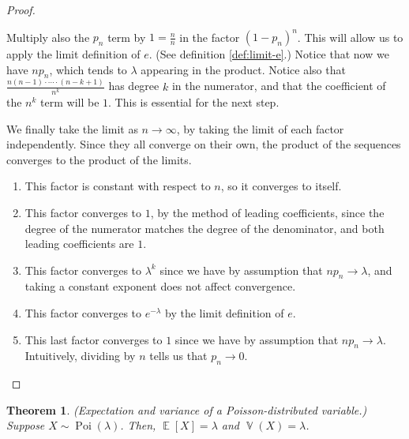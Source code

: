 \documentclass[11pt]{article}
\newtheorem{thm}{Theorem}
\theoremstyle{definition}
\theoremstyle{remark}
\newcommand{\parens}[1]{\left(#1\right)}
\DeclareMathOperator{\Expect}{\mathbb{E}}
\newcommand{\E}[1]{\Expect{\left[#1\right]}}
\DeclareMathOperator{\Var}{\mathbb{V}}
\newcommand{\V}[1]{\Var{\parens{#1}}}
\DeclareMathOperator{\PoiOp}{Poi}
\newcommand{\Poi}[1]{ \PoiOp\parens{#1} }
\begin{document}
\begin{proof}
\begin{description}
            Multiply also the $p_n$ term by $1 = \frac{n}{n}$ in the factor
            $(1 - p_n)^n$.
            This will allow us to apply the limit definition of $e$.
            (See definition \ref{def:limit-e}.)
            Notice that now we have $n p_n$, which tends to $\lambda$ appearing
            in the product.
            Notice also that $\frac{n(n-1) \cdot\cdots\cdot (n-k+1)}{n^k}$ has
            degree $k$ in the numerator, and that the coefficient of the $n^k$
            term will be $1$.
            This is essential for the next step.
        \item[\stepAB{4}{5}]
            We finally take the limit as $n \to \infty$, by taking the limit of
            each factor independently.
            Since they all converge on their own, the product of the sequences
            converges to the product of the limits.

            \begin{enumerate}
                \item
                    This factor is constant with respect to $n$, so it
                    converges to itself.
                \item
                    This factor converges to $1$, by the method of leading
                    coefficients, since the degree of the numerator matches the
                    degree of the denominator, and both leading coefficients
                    are $1$.
                \item
                    This factor converges to $\lambda^k$ since we have by
                    assumption that $n p_n \to \lambda$, and taking a constant
                    exponent does not affect convergence.
                \item
                    This factor converges to $e^{-\lambda}$ by the limit
                    definition of $e$.
                \item
                    This last factor converges to $1$ since we have by
                    assumption that $n p_n \to \lambda$. Intuitively, dividing
                    by $n$ tells us that $p_n \to 0$.
            \end{enumerate}
    \end{description}
\end{proof}

\begin{thm}{(Expectation and variance of a Poisson-distributed variable.)}
    \label{thm:poisson-expectation-variance}
    Suppose $X \sim \Poi{\lambda}$.
    Then, $\E{X} = \lambda$ and $\V{X} = \lambda$.
\end{thm}
\end{document}

